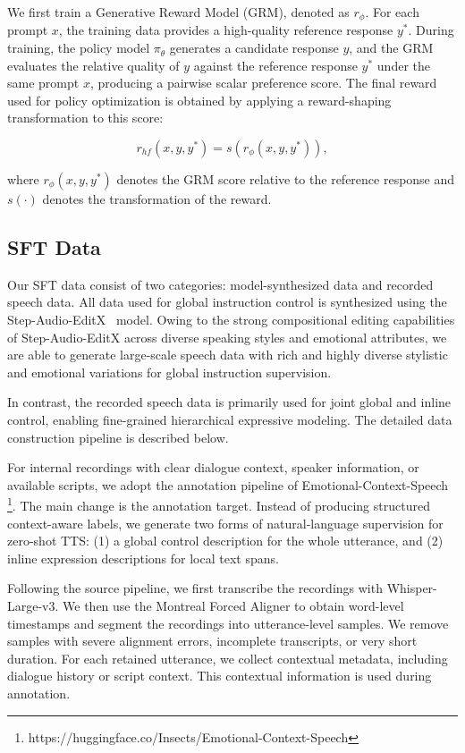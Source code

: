 We first train a Generative Reward Model (GRM), denoted as $r_\phi$. For each prompt $x$, the training data provides a high-quality reference response $y^*$. During training, the policy model $\pi_\theta$ generates a candidate response $y$, and the GRM evaluates the relative quality of $y$ against the reference response $y^*$ under the same prompt $x$, producing a pairwise scalar preference score. The final reward used for policy optimization is obtained by applying a reward-shaping transformation to this score:

\begin{equation}
r_{hf}(x, y, y^*) = s\!\left(r_\phi(x, y, y^*)\right),
\end{equation}

where $r_\phi(x, y, y^*)$ denotes the GRM score relative to the reference response and $s(\cdot)$ denotes the transformation of the reward.


\subsection{SFT Data}
\label{sec:SFT-data}
Our SFT data consist of two categories: model-synthesized data and recorded speech data. All data used for global instruction control is synthesized using the Step-Audio-EditX~\citep{yan2025stepaudioeditxtechnicalreport} model. Owing to the strong compositional editing capabilities of Step-Audio-EditX across diverse speaking styles and emotional attributes, we are able to generate large-scale speech data with rich and highly diverse stylistic and emotional variations for global instruction supervision.

In contrast, the recorded speech data is primarily used for joint global and inline control, enabling fine-grained hierarchical expressive modeling. The detailed data construction pipeline is described below.

For internal recordings with clear dialogue context, speaker information, or available scripts, we adopt the annotation pipeline of Emotional-Context-Speech \footnote{https://huggingface.co/Insects/Emotional-Context-Speech}. The main change is the annotation target. Instead of producing structured context-aware labels, we generate two forms of natural-language supervision for zero-shot TTS: (1) a global control description for the whole utterance, and (2) inline expression descriptions for local text spans.

Following the source pipeline, we first transcribe the recordings with Whisper-Large-v3. We then use the Montreal Forced Aligner to obtain word-level timestamps and segment the recordings into utterance-level samples. We remove samples with severe alignment errors, incomplete transcripts, or very short duration. For each retained utterance, we collect contextual metadata, including dialogue history or script context. This contextual information is used during annotation.

